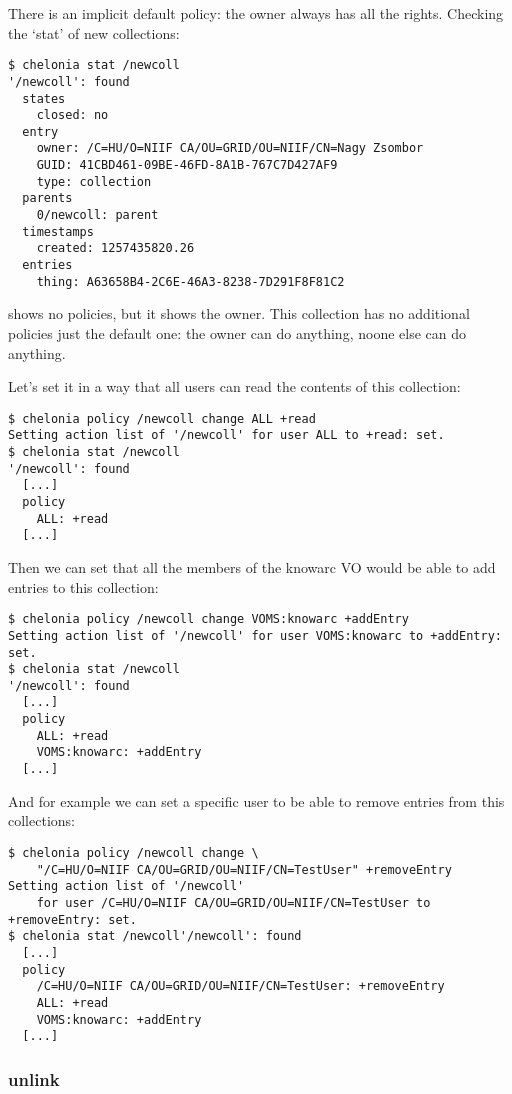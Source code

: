 There is an implicit default policy: the owner always has all the rights.
Checking the `stat' of new collections:
\begin{verbatim}
$ chelonia stat /newcoll
'/newcoll': found
  states
    closed: no
  entry
    owner: /C=HU/O=NIIF CA/OU=GRID/OU=NIIF/CN=Nagy Zsombor
    GUID: 41CBD461-09BE-46FD-8A1B-767C7D427AF9
    type: collection
  parents
    0/newcoll: parent
  timestamps
    created: 1257435820.26
  entries
    thing: A63658B4-2C6E-46A3-8238-7D291F8F81C2
\end{verbatim}
shows no policies, but it shows the owner. This collection has no additional policies just the default one: the owner can do anything, noone else can do anything.

Let's set it in a way that all users can read the contents of this collection:
\begin{verbatim}
$ chelonia policy /newcoll change ALL +read
Setting action list of '/newcoll' for user ALL to +read: set.
$ chelonia stat /newcoll
'/newcoll': found
  [...]
  policy
    ALL: +read
  [...]
\end{verbatim}

Then we can set that all the members of the knowarc VO would be able to add entries to this collection:
\begin{verbatim}
$ chelonia policy /newcoll change VOMS:knowarc +addEntry
Setting action list of '/newcoll' for user VOMS:knowarc to +addEntry: set.
$ chelonia stat /newcoll
'/newcoll': found
  [...]
  policy
    ALL: +read
    VOMS:knowarc: +addEntry
  [...]
\end{verbatim}

And for example we can set a specific user to be able to remove entries from this collections:
\begin{verbatim}
$ chelonia policy /newcoll change \
    "/C=HU/O=NIIF CA/OU=GRID/OU=NIIF/CN=TestUser" +removeEntry
Setting action list of '/newcoll'
    for user /C=HU/O=NIIF CA/OU=GRID/OU=NIIF/CN=TestUser to +removeEntry: set.
$ chelonia stat /newcoll'/newcoll': found
  [...]
  policy
    /C=HU/O=NIIF CA/OU=GRID/OU=NIIF/CN=TestUser: +removeEntry
    ALL: +read
    VOMS:knowarc: +addEntry
  [...]
\end{verbatim}


\subsubsection{unlink} %
\label{ssub:unlink}

